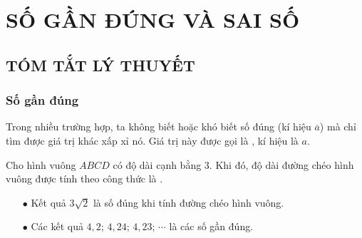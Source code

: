 \section{SỐ GẦN ĐÚNG VÀ SAI SỐ}
\subsection{TÓM TẮT LÝ THUYẾT}
\subsubsection{Số gần đúng}
	Trong nhiều trường hợp, ta không biết hoặc khó biết số đúng (kí hiệu $\overline{a}$) mà chỉ tìm được giá trị khác xấp xỉ nó. Giá trị này được gọi là , kí hiệu là $a$.
\begin{tcolorbox}[colframe=orange,colback=white,boxrule=0.2mm]
	 Cho hình vuông $ABCD$ có độ dài cạnh bằng 3. Khi đó, 
	độ dài đường chéo hình vuông được tính theo công thức là .  
	\begin{itemize}
		\item [$\bullet$] Kết quả $3\sqrt{2}$ là số đúng khi tính đường chéo hình vuông.
		\item [$\bullet$] Các kết quả \quad $4,2$; \quad $4,24$; \quad $4,23$; \quad$\cdots$ là các số gần đúng.
	\end{itemize}
\end{tcolorbox}
